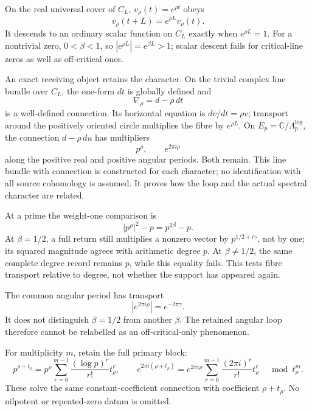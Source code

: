 On the real universal cover of \(C_L\), \(v_\rho(t)=e^{\rho t}\) obeys
\[
v_\rho(t+L)=e^{\rho L}v_\rho(t).
\tag{PL6.2}
\] It descends to an ordinary scalar function on \(C_L\) exactly when
\(e^{\rho L}=1\). For a nontrivial zero, \(0<\beta<1\), so
\(|e^{\rho L}|=e^{\beta L}>1\); scalar descent fails for critical-line
zeros as well as off-critical ones.

An exact receiving object retains the character. On the trivial complex
line bundle over \(C_L\), the one-form \(dt\) is globally defined and \[
\nabla_\rho=d-\rho\,dt
\tag{PL6.3}
\] is a well-defined connection. Its horizontal equation is
\(dv/dt=\rho v\); transport around the positively oriented circle
multiplies the fibre by \(e^{\rho L}\). On
\(E_p=\mathbb C/\Lambda_p^{\log}\), the connection \(d-\rho\,du\) has
multipliers \[
p^\rho,\qquad e^{2\pi i\rho}
\tag{PL6.4}
\] along the positive real and positive angular periods. Both remain.
This line bundle with connection is constructed for each character; no
identification with all source cohomology is assumed. It proves how the
loop and the actual spectral character are related.

At a prime the weight-one comparison is \[
|p^\rho|^2-p=p^{2\beta}-p.
\tag{PL6.5}
\] At \(\beta=1/2\), a full return still multiplies a nonzero vector by
\(p^{1/2+i\gamma}\), not by one; its squared magnitude agrees with
arithmetic degree \(p\). At \(\beta\ne1/2\), the same complete degree
record remains \(p\), while this equality fails. This tests fibre
transport relative to degree, not whether the support has appeared
again.

The common angular period has transport \[
|e^{2\pi i\rho}|=e^{-2\pi\gamma}.
\tag{PL6.6}
\] It does not distinguish \(\beta=1/2\) from another \(\beta\). The
retained angular loop therefore cannot be relabelled as an
off-critical-only phenomenon.

For multiplicity \(m\), retain the full primary block: \[
p^{\rho+t_\rho}
=p^\rho\sum_{r=0}^{m-1}\frac{(\log p)^r}{r!}t_\rho^r,\qquad
e^{2\pi i(\rho+t_\rho)}
=e^{2\pi i\rho}\sum_{r=0}^{m-1}\frac{(2\pi i)^r}{r!}t_\rho^r
\quad\bmod t_\rho^m.
\tag{PL6.7}
\] These solve the same constant-coefficient connection with coefficient
\(\rho+t_\rho\). No nilpotent or repeated-zero datum is omitted.

